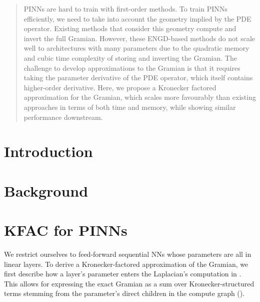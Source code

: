 \documentclass{article}
\begin{document}
\maketitle

\begin{abstract}
  PINNs are hard to train with first-order methods.
  To train PINNs efficiently, we need to take into account the geometry implied by the PDE operator.
  Existing methods that consider this geometry compute and invert the full Gramian.
  However, these ENGD-based methods do not scale well to architectures with many parameters due to the quadratic memory and cubic time complexity of storing and inverting the Gramian.
  The challenge to develop approximations to the Gramian is that it requires taking the parameter derivative of the PDE operator, which itself contains higher-order derivative.
  Here, we propose a Kronecker factored approximation for the Gramian, which scales more favourably than existing approaches in terms of both time and memory, while showing similar performance downstream.
\end{abstract}

\section{Introduction}



\section{Background}





\section{KFAC for PINNs}

We restrict ourselves to feed-forward sequential NNs whose parameters are all in linear layers.
To derive a Kronecker-factored approximation of the Gramian, we first describe how a layer's parameter enters the Laplacian's computation in .
This allows for expressing the exact Gramian as a sum over Kronecker-structured terms stemming from the parameter's direct children in the compute graph ().
\end{document}
